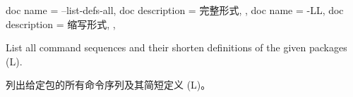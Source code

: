 \begin{docKeys}[
    doc no index,   %
    doc parameter = {~},
    ]
    {
    {
        doc name        = --list-defs-all,
        doc description = 完整形式,
    },
    {
        doc name        = -LL,
        doc description = 缩写形式,
    },
} 

List all command sequences and their shorten definitions of the given packages (L).

列出给定包的所有命令序列及其简短定义 (L)。
     
\end{docKeys}
    